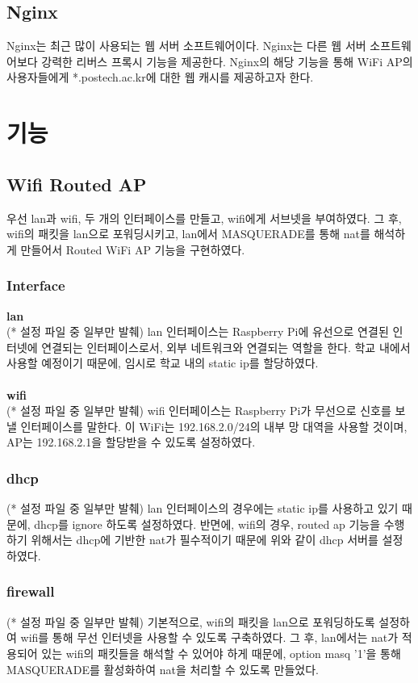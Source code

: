 \documentclass{article}
\begin{document}
    \subsection{Nginx}
     Nginx는 최근 많이 사용되는 웹 서버 소프트웨어이다. Nginx는 다른 웹 서버 소프트웨어보다 강력한 리버스 프록시 기능을 제공한다.
     Nginx의 해당 기능을 통해 WiFi AP의 사용자들에게 *.postech.ac.kr에 대한 웹 캐시를 제공하고자 한다.
    \section{기능}
    \subsection{Wifi Routed AP}
     우선 lan과 wifi, 두 개의 인터페이스를 만들고, wifi에게 서브넷을 부여하였다. 그 후, wifi의 패킷을 lan으로 포워딩시키고,
     lan에서 MASQUERADE를 통해 nat를 해석하게 만들어서 Routed WiFi AP 기능을 구현하였다.
    \subsubsection{Interface}
    \textbf{lan}\\
    (* 설정 파일 중 일부만 발췌) lan 인터페이스는 Raspberry Pi에 유선으로 연결된 인터넷에 연결되는 인터페이스로서, 외부 네트워크와 연결되는 역할을 한다.
    학교 내에서 사용할 예정이기 때문에, 임시로 학교 내의 static ip를 할당하였다. \\ \\
    \textbf{wifi}\\
    (* 설정 파일 중 일부만 발췌) wifi 인터페이스는 Raspberry Pi가 무선으로 신호를 보낼 인터페이스를 말한다. 이 WiFi는 192.168.2.0/24의 내부 망 대역을 사용할 것이며,
    AP는 192.168.2.1을 할당받을 수 있도록 설정하였다.

    \subsubsection{dhcp}
    (* 설정 파일 중 일부만 발췌) lan 인터페이스의 경우에는 static ip를 사용하고 있기 때문에, dhcp를 ignore 하도록 설정하였다.
    반면에, wifi의 경우, routed ap 기능을 수행하기 위해서는 dhcp에 기반한 nat가 필수적이기 때문에 위와 같이 dhcp 서버를 설정하였다.

    \subsubsection{firewall}
    (* 설정 파일 중 일부만 발췌) 기본적으로, wifi의 패킷을 lan으로 포워딩하도록 설정하여 wifi를 통해 무선 인터넷을 사용할 수 있도록 구축하였다.
    그 후, lan에서는 nat가 적용되어 있는 wifi의 패킷들을 해석할 수 있어야 하게 때문에,
    option masq '1'을 통해 MASQUERADE를 활성화하여 nat을 처리할 수 있도록 만들었다.
\end{document}
